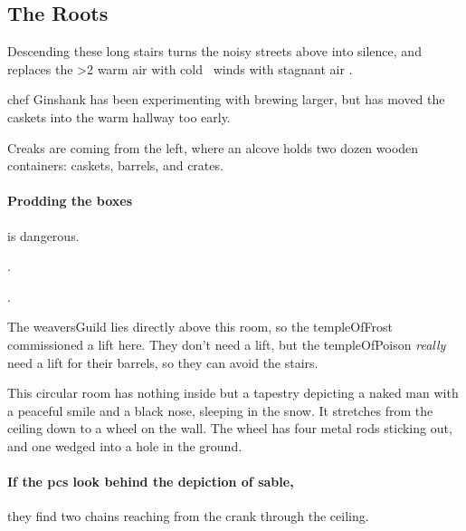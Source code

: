 \begin{multicols}{2}

\subsection{The Roots}


Descending these long stairs turns the noisy streets above into silence, and replaces the
\ifnum\value{temperature}>2%
  warm air with cold%
\else%
  \showTemperature\ winds with stagnant air%
\fi.

\begin{exampletext}
  \Gls{chef} Ginshank has been experimenting with brewing larger, but has moved the caskets into the warm hallway too early.
\end{exampletext}

\begin{boxtext}
  Creaks are coming from the left, where an alcove holds two dozen wooden containers: caskets, barrels, and crates.
\end{boxtext}

\paragraph{Prodding the boxes}
is dangerous.

.

.


\begin{exampletext}
  The \gls{weaversGuild} lies directly above this room, so the \gls{templeOfFrost} commissioned a lift here.
  They don't need a lift, but the \gls{templeOfPoison} \emph{really} need a lift for their barrels, so they can avoid the stairs.
\end{exampletext}

\begin{boxtext}
  This circular room has nothing inside but a tapestry depicting a naked man with a peaceful smile and a black nose, sleeping in the snow.
  It stretches from the ceiling down to a wheel on the wall.
  The wheel has four metal rods sticking out, and one wedged into a hole in the ground.
\end{boxtext}

\paragraph{If the \glspl{pc} look behind the depiction of \gls{sable},}
they find two chains reaching from the crank through the ceiling.


\end{multicols}
